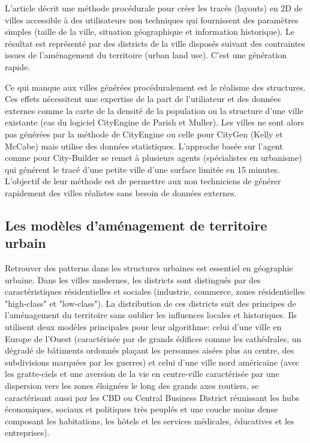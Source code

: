 \documentclass[11pt]{article}
\begin{document}
L'article décrit une méthode procédurale pour créer les tracés (layouts) en 2D de villes accessible à des utilisateurs non techniques qui fournissent des paramètres simples (taille de la ville, situation géographique et information historique). Le résultat est représenté par des districts de la ville disposés suivant des contraintes issues de l'aménagement du territoire (urban land use). C'est une génération rapide.

Ce qui manque aux villes générées procéduralement est le réalisme des structures. Ces effets nécessitent une expertise de la part de l'utiliateur et des données externes comme la carte de la densité de la population ou la structure d'une ville existante (cas du logiciel CityEngine de Parish et Muller). Les villes ne sont alors pas générées par la méthode de CityEngine ou celle pour CityGen (Kelly et McCabe) mais utilise des données statistiques. L'approche basée sur l'agent comme pour City-Builder se remet à plusieurs agents (spécialistes en urbanisme) qui générent le tracé d'une petite ville d'une surface limitée en 15 minutes. L'objectif de leur méthode est de permettre aux non techniciens de générer rapidement des villes réalistes sans besoin de données externes.

\subsection{Les modèles d'aménagement de territoire urbain}

Retrouver des patterns dans les structures urbaines est essentiel en géographie urbaine. Dans les villes modernes, les districts sont distingués par des caractéristiques résidentielles et sociales (industrie, commerce, zones résidentielles "high-class" et "low-class").
La distribution de ces districts suit des principes de l'aménagement du territoire sans oublier les influences locales et historiques. Ils utilisent deux modèles principales pour leur algorithme: celui d'une ville en Europe de l'Ouest (caractérisée par de grands édifices comme les cathédrales, un dégradé de bâtiments ordonnés plaçant les personnes aisées plus au centre, des subdivisions marquées par les guerres) et celui d'une ville nord américaine (avec les gratte-ciels et une aversion de la vie en centre-ville caractérisée par une dispersion vers les zones éloignées le long des grands axes routiers, se caractérisant aussi par les CBD ou Central Business District réunissant les hubs économiques, sociaux et politiques très peuplés et une couche moins dense composant les habitations, les hôtels et les services médicales, éducatives et les entreprises).
\end{document}
